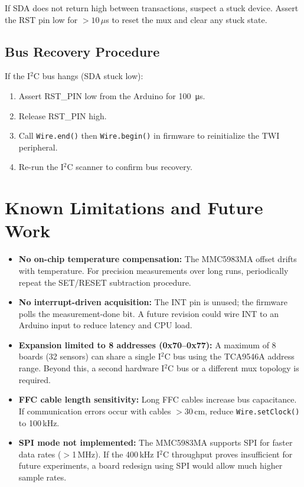 \documentclass[12pt]{article}
\begin{document}
If SDA does not return high between transactions, suspect a stuck device.
Assert the RST pin low for $>10\,\mu$s to reset the mux and clear any
stuck state.

\subsection{Bus Recovery Procedure}

If the I$^2$C bus hangs (SDA stuck low):
\begin{enumerate}
  \item Assert RST\_PIN low from the Arduino for \SI{100}{\micro\second}.
  \item Release RST\_PIN high.
  \item Call \texttt{Wire.end()} then \texttt{Wire.begin()} in firmware to
        reinitialize the TWI peripheral.
  \item Re-run the I$^2$C scanner to confirm bus recovery.
\end{enumerate}

\newpage
\section{Known Limitations and Future Work}

\begin{itemize}
  \item \textbf{No on-chip temperature compensation:} The MMC5983MA offset
        drifts with temperature. For precision measurements over long runs,
        periodically repeat the SET/RESET subtraction procedure.
  \item \textbf{No interrupt-driven acquisition:} The INT pin is unused;
        the firmware polls the measurement-done bit. A future revision
        could wire INT to an Arduino input to reduce latency and CPU load.
  \item \textbf{Expansion limited to 8 addresses (0x70--0x77):} A maximum
        of 8 boards (32 sensors) can share a single I$^2$C bus using the
        TCA9546A address range. Beyond this, a second hardware I$^2$C
        bus or a different mux topology is required.
  \item \textbf{FFC cable length sensitivity:} Long FFC cables increase
        bus capacitance. If communication errors occur with cables
        $>$30\,cm, reduce \texttt{Wire.setClock()} to 100\,kHz.
  \item \textbf{SPI mode not implemented:} The MMC5983MA supports SPI for
        faster data rates ($>$1\,MHz). If the 400\,kHz I$^2$C throughput
        proves insufficient for future experiments, a board redesign
        using SPI would allow much higher sample rates.
\end{itemize}
\end{document}
